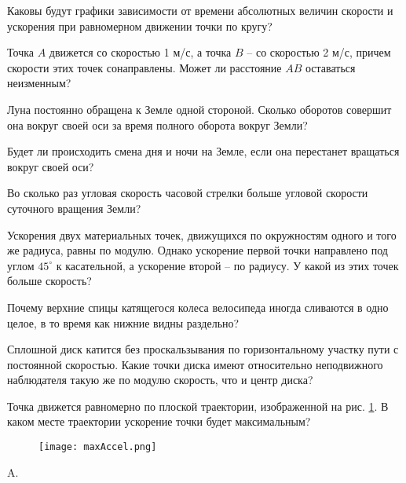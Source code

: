 \qualProblems

\begin{ex} %
Каковы будут графики зависимости от времени абсолютных величин скорости и ускорения при равномерном движении точки по кругу?
\end{ex}

\begin{ex}
Точка $A$ движется со скоростью 1 м/с, а точка $B$ – со скоростью 2 м/с, причем скорости этих точек
сонаправлены. Может ли расстояние $AB$ оставаться неизменным?
\end{ex}

\begin{ex}
Луна постоянно обращена к Земле одной стороной. Сколько оборотов совершит она вокруг своей оси за время полного оборота вокруг Земли?
\end{ex}

\begin{ex}
Будет ли происходить смена дня и ночи на Земле, если она перестанет вращаться вокруг своей оси?
\end{ex}

\begin{ex} 
Во сколько раз угловая скорость часовой стрелки больше угловой скорости суточного вращения Земли?
\end{ex}

\begin{ex} 
Ускорения двух материальных точек, движущихся по окружностям одного и того же радиуса, равны по модулю. Однако ускорение первой точки направлено под углом $45^{\circ}$ к касательной, а ускорение второй – по радиусу. У какой из этих точек больше скорость?
\end{ex}

\begin{ex} 
Почему верхние спицы катящегося колеса велосипеда иногда сливаются в одно целое, в то время как нижние видны раздельно?
\end{ex}

\begin{ex} 
Сплошной диск катится без проскальзывания по горизонтальному участку пути с постоянной скоростью. Какие точки диска имеют относительно неподвижного наблюдателя такую же по модулю скорость, что и центр диска?
\end{ex}

\begin{ex} %
Точка движется равномерно по плоской траектории, изображенной на рис. \ref{maxAccel}. В каком месте траектории ускорение точки будет максимальным?

\begin{figure}[h]
\centering
\texttt{[image: maxAccel.png]}
\caption{}
\label{maxAccel}
\end{figure}
\begin{ans}
A.
\end{ans}
\end{ex}

